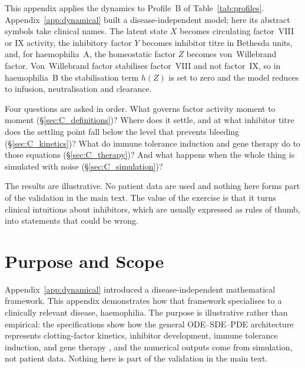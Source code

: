 
\label{app:hemo_dynamics}

\begin{ataglance}
This appendix applies the dynamics to Profile~B of Table~\ref{tab:profiles}.
Appendix~\ref{app:dynamical} built a disease-independent model; here its
abstract symbols take clinical names. The latent state $X$ becomes circulating factor~VIII or
IX activity, the inhibitory factor $Y$ becomes inhibitor titre in Bethesda
units, and, for haemophilia~A, the homeostatic factor $Z$ becomes von~Willebrand
factor. Von~Willebrand factor stabilises factor~VIII and not factor~IX, so in
haemophilia~B the stabilisation term $h(Z)$ is set to zero and the model
reduces to infusion, neutralisation and clearance.

Four questions are asked in order. What governs factor activity moment to
moment (\S\ref{sec:C_definitions})? Where does it settle, and at what inhibitor
titre does the settling point fall below the level that prevents bleeding
(\S\ref{sec:C_kinetics})? What do immune tolerance induction and gene therapy do
to those equations (\S\ref{sec:C_therapy})? And what happens when the whole
thing is simulated with noise (\S\ref{sec:C_simulation})?

The results are illustrative. No patient data are used and nothing here forms
part of the validation in the main text. The value of the exercise is that it
turns clinical intuitions about inhibitors, which are usually expressed as rules
of thumb, into statements that could be wrong.
\end{ataglance}

\section{Purpose and Scope}
\label{sec:C_purpose}
Appendix~\ref{app:dynamical} introduced a disease-independent mathematical
framework. This appendix demonstrates how that framework specialises to a
clinically relevant disease, haemophilia. The purpose is illustrative rather
than empirical: the specifications show how the general ODE--SDE--PDE
architecture represents clotting-factor kinetics, inhibitor development, immune
tolerance induction, and gene therapy \citep{nathwani_2011}, and the numerical outputs come from
simulation, not patient data. Nothing here is part of the validation in the main
text.

